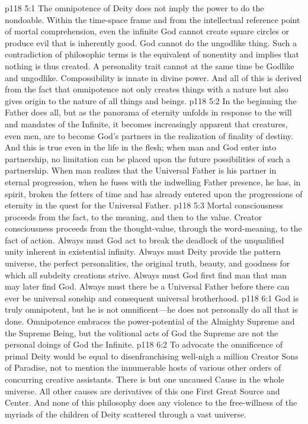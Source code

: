 \vs p118 5:1 The omnipotence of Deity does not imply the power to do the nondoable. Within the time\hyp{}space frame and from the intellectual reference point of mortal comprehension, even the infinite God cannot create square circles or produce evil that is inherently good. God cannot do the ungodlike thing. Such a contradiction of philosophic terms is the equivalent of nonentity and implies that nothing is thus created. A personality trait cannot at the same time be Godlike and ungodlike. Compossibility is innate in divine power. And all of this is derived from the fact that omnipotence not only creates things with a nature but also gives origin to the nature of all things and beings.
\pc \vs p118 5:2 In the beginning the Father does all, but as the panorama of eternity unfolds in response to the will and mandates of the Infinite, it becomes increasingly apparent that creatures, even men, are to become God’s partners in the realization of finality of destiny. And this is true even in the life in the flesh; when man and God enter into partnership, no limitation can be placed upon the future possibilities of such a partnership. When man realizes that the Universal Father is his partner in eternal progression, when he fuses with the indwelling Father presence, he has, in spirit, broken the fetters of time and has already entered upon the progressions of eternity in the quest for the Universal Father.
\vs p118 5:3 Mortal consciousness proceeds from the fact, to the meaning, and then to the value. Creator consciousness proceeds from the thought\hyp{}value, through the word\hyp{}meaning, to the fact of action. Always must God act to break the deadlock of the unqualified unity inherent in existential infinity. Always must Deity provide the pattern universe, the perfect personalities, the original truth, beauty, and goodness for which all subdeity creations strive. Always must God first find man that man may later find God. Always must there be a Universal Father before there can ever be universal sonship and consequent universal brotherhood.
\vs p118 6:1 God is truly omnipotent, but he is not omnificent---he does not personally do all that is done. Omnipotence embraces the power\hyp{}potential of the Almighty Supreme and the Supreme Being, but the volitional acts of God the Supreme are not the personal doings of God the Infinite.
\vs p118 6:2 To advocate the omnificence of primal Deity would be equal to disenfranchising well\hyp{}nigh a million Creator Sons of Paradise, not to mention the innumerable hosts of various other orders of concurring creative assistants. There is but one uncaused Cause in the whole universe. All other causes are derivatives of this one First Great Source and Center. And none of this philosophy does any violence to the free\hyp{}willness of the myriads of the children of Deity scattered through a vast universe.

